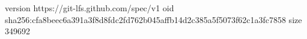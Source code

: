 version https://git-lfs.github.com/spec/v1
oid sha256:cfa8beec6a391a3f8d8fdc2fd762b045affb14d2c385a5f5073f62c1a3fc7858
size 349692
